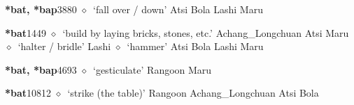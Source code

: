   \begin{list}{}{\leftmargin=1.5em \itemindent=-1.5em}
  \item {\footnotesize \textbf{*bat, *bap}}{\tiny 3880}
         $\diamond$~`fall over / down'
         Atsi 
\hspace{1ex}
         Bola 
\hspace{1ex}
         Lashi 
\hspace{1ex}
         Maru 
  \item {\footnotesize \textbf{*bat}}{\tiny 1449}
\hspace{1ex}
         $\diamond$~`build by laying bricks, stones, etc.'
         Achang\_Longchuan 
\hspace{1ex}
         Atsi 
\hspace{1ex}
         Maru 
\hspace{1ex}
         $\diamond$~`halter / bridle'
         Lashi 
\hspace{1ex}
         $\diamond$~`hammer'
         Atsi 
\hspace{1ex}
         Bola 
\hspace{1ex}
         Lashi 
\hspace{1ex}
         Maru 
  \item {\footnotesize \textbf{*bat, *bap}}{\tiny 4693}
\hspace{1ex}
         $\diamond$~`gesticulate'
         Rangoon 
\hspace{1ex}
         Maru 
  \item {\footnotesize \textbf{*bat}}{\tiny 10812}
\hspace{1ex}
         $\diamond$~`strike (the table)'
         Rangoon 
\hspace{1ex}
         Achang\_Longchuan 
\hspace{1ex}
         Atsi 
\hspace{1ex}
         Bola 
\hspace{1ex}

\end{list}
